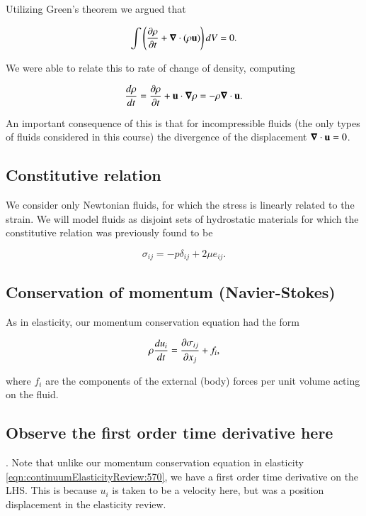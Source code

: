 Utilizing Green's theorem we argued that 

\begin{equation}\label{eqn:continuumFluidsReview:1030}
\int \left( \PD{t}{\rho} + \spacegrad \cdot (\rho \Bu) \right) dV = 0.
\end{equation}

We were able to relate this to rate of change of density, computing

\begin{equation}\label{eqn:continuumFluidsReview:1050}
\frac{d\rho}{dt} = \PD{t}{\rho} + \Bu \cdot \spacegrad \rho =
- \rho \spacegrad \cdot \Bu.
\end{equation}

An important consequence of this is that for incompressible fluids (the only types of fluids considered in this course) the divergence of the displacement $\spacegrad \cdot \Bu = 0$.

\subsection{Constitutive relation}

We consider only Newtonian fluids, for which the stress is linearly related to the strain.  We will model fluids as disjoint sets of hydrostatic materials for which the constitutive relation was previously found to be

\begin{equation}\label{eqn:continuumFluidsReview:1070}
\sigma_{ij} = - p \delta_{ij} + 2 \mu e_{ij}.
\end{equation}

\subsection{Conservation of momentum (Navier-Stokes)}

As in elasticity, our momentum conservation equation had the form

\begin{equation}\label{eqn:continuumFluidsReview:1090}
\rho \frac{du_i}{dt} = \PD{x_j}{\sigma_{ij}} + f_i,
\end{equation}

where $f_i$ are the components of the external (body) forces per unit volume acting on the fluid.

\subsection{Observe the first order time derivative here}.  Note that unlike our momentum conservation equation in elasticity \ref{eqn:continuumElasticityReview:570}, we have a first order time derivative on the LHS.  This is because $u_i$ is taken to be a velocity here, but was a position displacement in the elasticity review.

